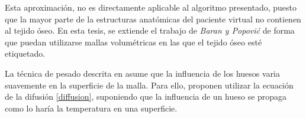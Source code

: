 Esta aproximación, no es directamente aplicable al algoritmo presentado, puesto que la mayor parte de la estructuras anatómicas del paciente virtual no contienen al tejido óseo. En esta tesis, se extiende el trabajo de \emph{Baran y Popovi\'{c}} de forma que puedan utilizarse mallas volumétricas en las que el tejido óseo esté etiquetado.  

%


La técnica de pesado descrita en \cite{Baran:2007} asume que la influencia de los huesos varia suavemente en la superficie de la malla. Para ello, proponen utilizar la ecuación de la difusión \ref{diffusion}, suponiendo que la influencia de un hueso se propaga como lo haría la temperatura en una superficie. 

